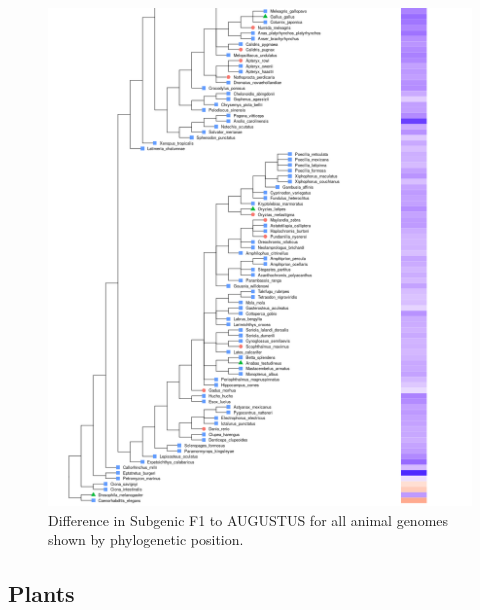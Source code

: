 \documentclass{article}
\renewcommand{\thefigure}{S\arabic{figure}}
\begin{document}
\begin{figure}[!h]
\centerline{\includegraphics[width=\textwidth]{images/animals_differences_part2}}
\caption{Difference in Subgenic F1 to AUGUSTUS for all animal genomes shown by phylogenetic position.}
\end{figure}

\clearpage
\subsection{Plants}
\end{document}
